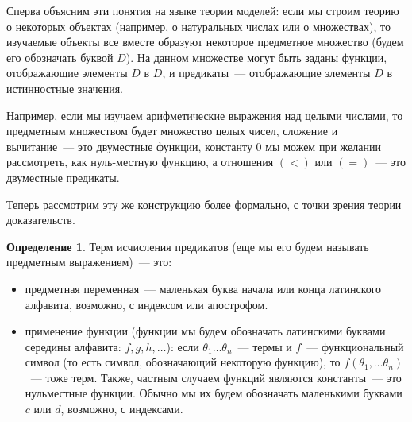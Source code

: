 \documentclass[a4paper,11pt]{article}
\theoremstyle{definition}
\newtheorem{dfn}[thm]{Определение}
\begin{document}
Сперва объясним эти понятия на языке теории моделей: если мы строим теорию о
некоторых объектах (например, о натуральных числах или о множествах), то
изучаемые объекты все вместе образуют некоторое предметное множество (будем его
обозначать буквой $D$). На данном множестве могут быть заданы функции,
отображающие элементы $D$ в $D$, и предикаты~--- отображающие элементы $D$ в
истинностные значения.

Например, если мы изучаем арифметические выражения над целыми числами, то
предметным множеством будет множество целых чисел, сложение и вычитание~--- это
двуместные функции, константу $0$ мы можем при желании рассмотреть, как
нуль-местную функцию, а отношения $(<)$ или $(=)$~--- это двуместные предикаты.

Теперь рассмотрим эту же конструкцию более формально, с точки зрения теории
доказательств.

\begin{dfn}
Терм исчисления предикатов (еще мы его будем называть предметным выражением)~---
это:
\begin{itemize}
\item предметная переменная~--- маленькая буква начала или конца латинского
  алфавита, возможно, с индексом или апострофом.
\item применение функции (функции мы будем обозначать латинскими буквами
  середины алфавита: $f, g, h, \dots$): если $\theta_1 \dots \theta_n$~--- термы
  и $f$~--- функциональный символ (то есть символ, обозначающий некоторую
  функцию), то $f(\theta_1, \dots \theta_n)$~--- тоже терм. Также, частным
  случаем функций являются константы~--- это нульместные функции. Обычно мы их
  будем обозначать маленькими буквами $c$ или $d$, возможно, с индексами.
\end{itemize}
\end{dfn}
\end{document}
